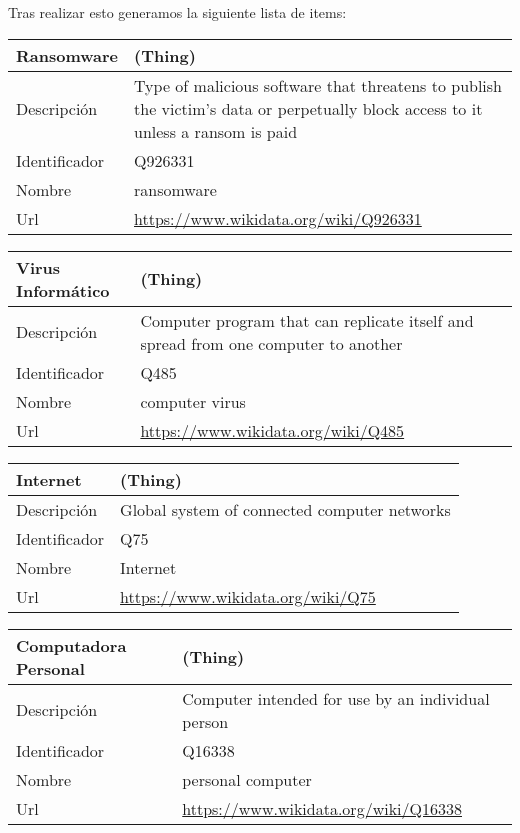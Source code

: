 \documentclass{llncs}   %
\begin{document}
Tras realizar esto generamos la siguiente lista de items:
\begin{table}
    \begin{tabu} to \textwidth {X[l]X[2]}
        \toprule
        Ransomware & (Thing) \\ \midrule
        Descripción & Type of malicious software that threatens to publish the victim's data or perpetually block access to it unless a ransom is paid \\
        Identificador &  Q926331 \\
        Nombre & ransomware \\
        Url & \href{https://www.wikidata.org/wiki/Q926331}{https://www.wikidata.org/wiki/Q926331} \\ \bottomrule
    \end{tabu}
\end{table}
\begin{table}
    \begin{tabu} to \textwidth {X[l]X[2]}
        \toprule
        Virus Informático & (Thing) \\ \midrule
        Descripción & Computer program that can replicate itself and spread from one computer to another \\
        Identificador &  Q485 \\
        Nombre & computer virus \\
        Url & \href{https://www.wikidata.org/wiki/Q485}{https://www.wikidata.org/wiki/Q485} \\ \bottomrule
    \end{tabu}
\end{table}
\begin{table}
    \begin{tabu} to \textwidth {X[l]X[2]}
        \toprule
        Internet & (Thing) \\ \midrule
        Descripción & Global system of connected computer networks \\
        Identificador &  Q75 \\
        Nombre & Internet \\
        Url & \href{https://www.wikidata.org/wiki/Q75}{https://www.wikidata.org/wiki/Q75} \\ \bottomrule
    \end{tabu}
\end{table}
\begin{table}
    \begin{tabu} to \textwidth {X[l]X[2]}
        \toprule
        Computadora Personal & (Thing) \\ \midrule
        Descripción & Computer intended for use by an individual person \\
        Identificador &  Q16338 \\
        Nombre & personal computer \\
        Url & \href{https://www.wikidata.org/wiki/Q16338}{https://www.wikidata.org/wiki/Q16338} \\ \bottomrule
    \end{tabu}
\end{table}
\end{document}
